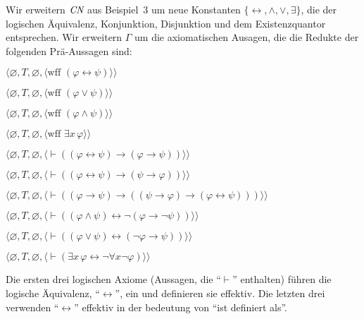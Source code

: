 Wir erweitern $\mbox{\em CN}$ aus Beispiel~3 um neue Konstanten $\{\leftrightarrow, \wedge,\vee,\exists\}$, die der logischen Äquivalenz, Konjunktion, Disjunktion und dem Existenzquantor entsprechen. Wir erweitern $\Gamma$ um die axiomatischen Ausagen, die die Redukte der folgenden Prä-Aussagen sind:
\begin{list}{}{\itemsep 0.0pt}
      \item[] $\langle\varnothing,T,\varnothing,
               \langle \mbox{wff\ }(\varphi\leftrightarrow\psi)\rangle\rangle$
      \item[] $\langle\varnothing,T,\varnothing,
               \langle \mbox{wff\ }(\varphi\vee\psi)\rangle\rangle$
      \item[] $\langle\varnothing,T,\varnothing,
               \langle \mbox{wff\ }(\varphi\wedge\psi)\rangle\rangle$
      \item[] $\langle\varnothing,T,\varnothing,
               \langle \mbox{wff\ }\exists x\, \varphi\rangle\rangle$
  \item[] $\langle\varnothing,T,\varnothing,
     \langle\vdash ( ( \varphi \leftrightarrow \psi ) \to
     ( \varphi \to \psi ) )\rangle\rangle$
  \item[] $\langle\varnothing,T,\varnothing,
     \langle\vdash ((\varphi\leftrightarrow\psi)\to
    (\psi\to\varphi))\rangle\rangle$
  \item[] $\langle\varnothing,T,\varnothing,
     \langle\vdash ((\varphi\to\psi)\to(
     (\psi\to\varphi)\to(\varphi
     \leftrightarrow\psi)))\rangle\rangle$
  \item[] $\langle\varnothing,T,\varnothing,
     \langle\vdash (( \varphi \wedge \psi ) \leftrightarrow\neg ( \varphi
     \to \neg \psi )) \rangle\rangle$
  \item[] $\langle\varnothing,T,\varnothing,
     \langle\vdash (( \varphi \vee \psi ) \leftrightarrow (\neg \varphi
     \to \psi )) \rangle\rangle$
  \item[] $\langle\varnothing,T,\varnothing,
     \langle\vdash (\exists x \,\varphi\leftrightarrow
     \lnot \forall x \lnot \varphi)\rangle\rangle$
\end{list}
Die ersten drei logischen Axiome (Aussagen, die "`$\vdash$"' enthalten) führen die logische Äquivalenz, "`$\leftrightarrow$"', ein und definieren sie effektiv.  Die letzten drei verwenden "`$\leftrightarrow$"' effektiv in der bedeutung von "`ist definiert als"'.


